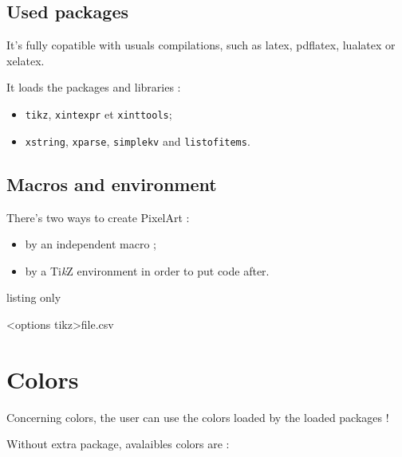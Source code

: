 \documentclass{article}
\begin{document}
\subsection{Used packages}

It's fully copatible with usuals compilations, such as \textsf{latex}, \textsf{pdflatex}, \textsf{lualatex} or \textsf{xelatex}.

\medskip

It loads the packages and libraries :

\begin{itemize}
	\item \texttt{tikz}, \texttt{xintexpr} et \texttt{xinttools};
	\item \texttt{xstring}, \texttt{xparse}, \texttt{simplekv} and \texttt{listofitems}.
\end{itemize}

\pagebreak

\subsection{Macros and environment}

There's two ways to create PixelArt :

\begin{itemize}
	\item by an independent macro ;
	\item by a Ti\textit{k}Z environment in order to put code after.
\end{itemize}

\begin{PresentationCode}{listing only}


\begin{EnvPixlArtTikz}[keys]<options tikz>{file.csv}
\end{EnvPixlArtTikz}
\end{PresentationCode}

\section{Colors}

Concerning colors, the user can use the colors loaded by the loaded packages !

\smallskip

Without extra package, avalaibles colors are :
\end{document}

